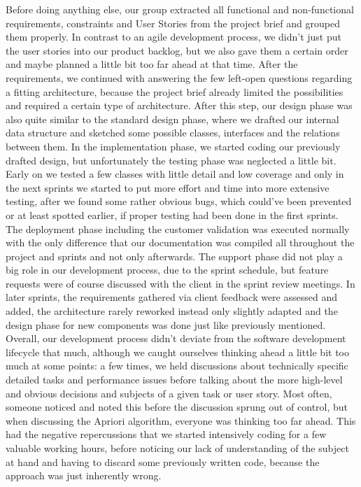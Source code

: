 Before doing anything else, our group extracted all functional and non-functional requirements, constraints and User Stories from the project brief and grouped them properly. In contrast to an agile development process, we didn’t just put the user stories into our product backlog, but we also gave them a certain order and maybe planned a little bit too far ahead at that time. After the requirements, we continued with answering the few left-open questions regarding a fitting architecture, because the project brief already limited the possibilities and required a certain type of architecture. After this step, our design phase was also quite similar to the standard design phase, where we drafted our internal data structure and sketched some possible classes, interfaces and the relations between them. In the implementation phase, we started coding our previously drafted design, but unfortunately the testing phase was neglected a little bit. Early on we tested a few classes with little detail and low coverage and only in the next sprints we started to put more effort and time into more extensive testing, after we found some rather obvious bugs, which could’ve been prevented or at least spotted earlier, if proper testing had been done in the first sprints. The deployment phase including the customer validation was executed normally with the only difference that our documentation was compiled all throughout the project and sprints and not only afterwards. The support phase did not play a big role in our development process, due to the sprint schedule, but feature requests were of course discussed with the client in the sprint review meetings. In later sprints, the requirements gathered via client feedback were assessed and added, the architecture rarely reworked instead only slightly adapted and the design phase for new components was done just like previously mentioned. Overall, our development process didn’t deviate from the software development lifecycle that much, although we caught ourselves thinking ahead a little bit too much at some points: a few times, we held discussions about technically specific detailed tasks and performance issues before talking about the more high-level and obvious decisions and subjects of a given task or user story. Most often, someone noticed and noted this before the discussion sprung out of control, but when discussing the Apriori algorithm, everyone was thinking too far ahead. This had the negative repercussions that we started intensively coding for a few valuable working hours, before noticing our lack of understanding of the subject at hand and having to discard some previously written code, because the approach was just inherently wrong. \\
